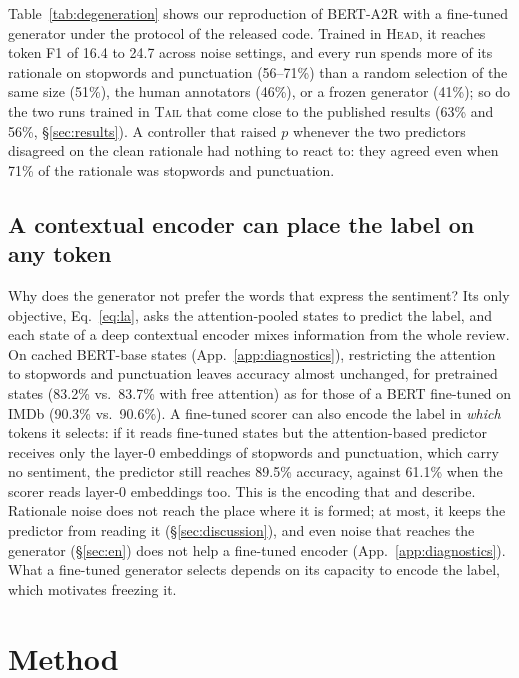 \documentclass[11pt]{article}
\newcommand{\HEAD}{\textup{\textsc{Head}}}
\newcommand{\TAIL}{\textup{\textsc{Tail}}}
\begin{document}
Table~\ref{tab:degeneration} shows our reproduction of BERT-A2R with a fine-tuned generator under the protocol of the released code. Trained in \HEAD, it reaches token F1 of 16.4 to 24.7 across noise settings, and every run spends more of its rationale on stopwords and punctuation (56--71\%) than a random selection of the same size (51\%), the human annotators (46\%), or a frozen generator (41\%); so do the two runs trained in \TAIL{} that come close to the published results (63\% and 56\%, \S\ref{sec:results}). A controller that raised $p$ whenever the two predictors disagreed on the clean rationale had nothing to react to: they agreed even when 71\% of the rationale was stopwords and punctuation.

\subsection{A contextual encoder can place the label on any token}
\label{sec:anywhere}

Why does the generator not prefer the words that express the sentiment? Its only objective, Eq.~\ref{eq:la}, asks the attention-pooled states to predict the label, and each state of a deep contextual encoder mixes information from the whole review. On cached BERT-base states (App.~\ref{app:diagnostics}), restricting the attention to stopwords and punctuation leaves accuracy almost unchanged, for pretrained states (83.2\% vs.\ 83.7\% with free attention) as for those of a BERT fine-tuned on IMDb (90.3\% vs.\ 90.6\%). A fine-tuned scorer can also encode the label in \emph{which} tokens it selects: if it reads fine-tuned states but the attention-based predictor receives only the layer-0 embeddings of stopwords and punctuation, which carry no sentiment, the predictor still reaches 89.5\% accuracy, against 61.1\% when the scorer reads layer-0 embeddings too. This is the encoding that \citet{yu-etal-2019-rethinking} and \citet{jacovi-goldberg-2021-aligning} describe. Rationale noise does not reach the place where it is formed; at most, it keeps the predictor from reading it (\S\ref{sec:discussion}), and even noise that reaches the generator (\S\ref{sec:en}) does not help a fine-tuned encoder (App.~\ref{app:diagnostics}). What a fine-tuned generator selects depends on its capacity to encode the label, which motivates freezing it.

\section{Method}
\label{sec:method}
\end{document}
